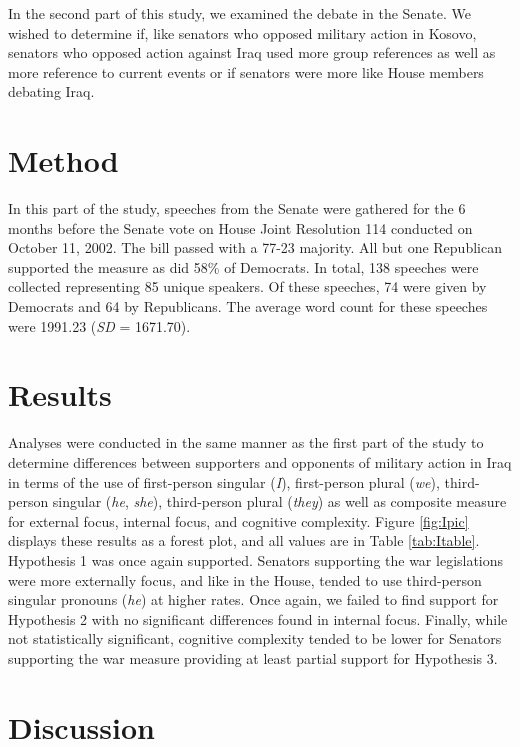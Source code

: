 \documentclass[english,,man,floatsintext]{apa6}
\begin{document}
In the second part of this study, we examined the debate in the Senate. We wished to determine if, like senators who opposed military action in Kosovo, senators who opposed action against Iraq used more group references as well as more reference to current events or if senators were more like House members debating Iraq.

\hypertarget{method-4}{%
\section{Method}\label{method-4}}

In this part of the study, speeches from the Senate were gathered for the 6 months before the Senate vote on House Joint Resolution 114 conducted on October 11, 2002. The bill passed with a 77-23 majority. All but one Republican supported the measure as did 58\% of Democrats. In total, 138 speeches were collected representing 85 unique speakers. Of these speeches, 74 were given by Democrats and 64 by Republicans. The average word count for these speeches were 1991.23 (\emph{SD} = 1671.70).

\hypertarget{results-3}{%
\section{Results}\label{results-3}}

Analyses were conducted in the same manner as the first part of the study to determine differences between supporters and opponents of military action in Iraq in terms of the use of first-person singular (\emph{I}), first-person plural (\emph{we}), third-person singular (\emph{he}, \emph{she}), third-person plural (\emph{they}) as well as composite measure for external focus, internal focus, and cognitive complexity. Figure \ref{fig:Ipic} displays these results as a forest plot, and all values are in Table \ref{tab:Itable}. Hypothesis 1 was once again supported. Senators supporting the war legislations were more externally focus, and like in the House, tended to use third-person singular pronouns (\emph{he}) at higher rates. Once again, we failed to find support for Hypothesis 2 with no significant differences found in internal focus. Finally, while not statistically significant, cognitive complexity tended to be lower for Senators supporting the war measure providing at least partial support for Hypothesis 3.

\hypertarget{discussion-1}{%
\section{Discussion}\label{discussion-1}}
\end{document}

